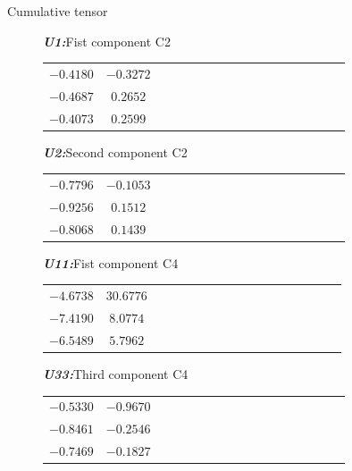 \documentclass[t,12pt,english
\ifx\beamermode\undefined\else,\beamermode\fi
]{beamer}
\begin{document}
\begin{frame}{Cumulative tensor}

\begin{figure}[!htb]

\begin{table}[!htbp]
\tiny\centering
\tiny{\textbf{\textit{U1:}}Fist component C2}\\
\begin{tabular}{c c c c c c c c c c c c c c c c c} 
  \hline  
   $-0.4180$&$-0.3272$\\
   $-0.4687$&$0.2652$\\
   $-0.4073$&$0.2599$\\
 \hline
\end{tabular}
\end{table}


\endminipage
{}
\centering
  \begin{table}[!htbp]
\tiny\centering
\tiny{\textbf{\textit{U2:}}Second component C2}\\
\begin{tabular}{c c c c c c c c c c c c c c c c c} 
  \hline  

   $-0.7796$&$-0.1053$\\
   $-0.9256$&$ 0.1512$\\
   $-0.8068$&$ 0.1439$\\
 \hline
\end{tabular}
\end{table}



\endminipage
\end{figure}

\begin{figure}[!htb]

  \begin{table}[!htbp]
\tiny\centering
\tiny{\textbf{\textit{U11:}}Fist component C4}\\
\begin{tabular}{c c c c c c c c c c c c c c c c c} 
  \hline  
   $-4.6738$&$30.6776$\\
   $-7.4190$&$ 8.0774$\\
   $-6.5489$&$ 5.7962$\\
 \hline
 \end{tabular}
\end{table}

  \begin{table}[!htbp]
\tiny\centering
\tiny{\textbf{\textit{U33:}}Third component C4}\\
\begin{tabular}{c c c c c c c c c c c c c c c c c}
 \hline  
   $-0.5330$&$-0.9670$\\
   $-0.8461$&$-0.2546$\\
   $-0.7469$&$-0.1827$\\
 \hline
\end{tabular}
\end{table}



\end{figure}
\end{frame}
\end{document}
